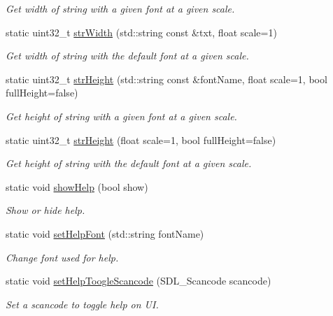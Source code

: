 \begin{DoxyCompactItemize}
\begin{DoxyCompactList}\small\item\em Get width of string with a given font at a given scale. \end{DoxyCompactList}\item 
static uint32\+\_\+t \hyperlink{class_a_base_u_i_a3a2fc2e4050d21c1e5f5c48b5514254e}{str\+Width} (std\+::string const \&txt, float scale=1)
\begin{DoxyCompactList}\small\item\em Get width of string with the default font at a given scale. \end{DoxyCompactList}\item 
static uint32\+\_\+t \hyperlink{class_a_base_u_i_a13e855c7ec774ca5dda69dc863c28e1b}{str\+Height} (std\+::string const \&font\+Name, float scale=1, bool full\+Height=false)
\begin{DoxyCompactList}\small\item\em Get height of string with a given font at a given scale. \end{DoxyCompactList}\item 
static uint32\+\_\+t \hyperlink{class_a_base_u_i_a3bf03252e330f24fe2fc044e380b4c19}{str\+Height} (float scale=1, bool full\+Height=false)
\begin{DoxyCompactList}\small\item\em Get height of string with the default font at a given scale. \end{DoxyCompactList}\item 
static void \hyperlink{class_a_base_u_i_a6cee1445e2dcf10626d1d431b4f9d227}{show\+Help} (bool show)
\begin{DoxyCompactList}\small\item\em Show or hide help. \end{DoxyCompactList}\item 
static void \hyperlink{class_a_base_u_i_a2e638887f2b479e3e6eda17473651a4c}{set\+Help\+Font} (std\+::string font\+Name)
\begin{DoxyCompactList}\small\item\em Change font used for help. \end{DoxyCompactList}\item 
static void \hyperlink{class_a_base_u_i_acb9967f11c239efc3b8536866a52cdc5}{set\+Help\+Toogle\+Scancode} (S\+D\+L\+\_\+\+Scancode scancode)
\begin{DoxyCompactList}\small\item\em Set a scancode to toggle help on UI. \end{DoxyCompactList}\item 

\end{DoxyCompactItemize}
